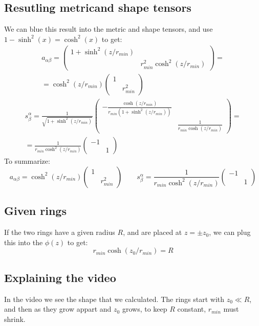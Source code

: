 \documentclass{article}
\begin{document}
\subsection{Resutling metricand shape tensors}
We can blue this result into the metric and shape tensors, and use $1 - \sinh^2(x) = \cosh^2(x)$ to get:
\begin{equation}
\begin{gathered}
    a_{\alpha\beta} = 
    \begin{pmatrix}
        1 + \sinh^2(z/r_{min}) & \\ & r_{min}^2\cosh^2(z/r_{min})
    \end{pmatrix} = \\ =
    \cosh^2(z/r_{min})
    \begin{pmatrix}
        1 & \\ & r_{min}^2
    \end{pmatrix}
\end{gathered}
\end{equation}
\begin{equation}
\begin{gathered}
    s^\alpha_\beta =
    \frac{1}{\sqrt{1 + \sinh^2(z/r_{min})}}
    \begin{pmatrix}
        -\frac{\cosh(z/r_{min})}{r_{min}\left(1 + \sinh^2(z/r_{min})\right)} & \\ & \frac{1}{r_{min}\cosh(z/r_{min})}
    \end{pmatrix} = \\ =
    \frac{1}{r_{min}\cosh^2(z/r_{min})}
    \begin{pmatrix}
        -1 & \\ & 1
    \end{pmatrix}
\end{gathered}
\end{equation}
To summarize:
\begin{equation}
    \boxed{a_{\alpha\beta} = \cosh^2(z/r_{min})
    \begin{pmatrix}
        1 & \\ & r_{min}^2
    \end{pmatrix}
    \qquad
    s^\alpha_\beta =
    \frac{1}{r_{min}\cosh^2(z/r_{min})}
    \begin{pmatrix}
        -1 & \\ & 1
    \end{pmatrix}
    }
\end{equation}
\subsection{Given rings}
If the two rings have a given radius $R$, and are placed at $z = \pm z_0$, we can plug this into the $\phi(z)$ to get:
\begin{equation}
    \boxed{r_{min}\cosh(z_0/r_{min}) = R}
\end{equation}
\subsection{Explaining the video}
In the video we see the shape that we calculated. The rings start with $z_0 \ll R$, and then as they grow appart and $z_0$ grows, to keep $R$ constant, $r_{min}$ must shrink.
\end{document}

